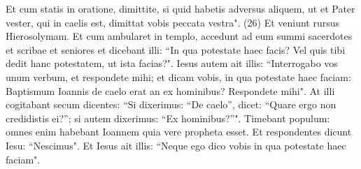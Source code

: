 \begin{biblechapter}
\verse Et cum statis in oratione, dimittite, si quid habetis adversus aliquem, ut et Pater vester, qui in caelis est, dimittat vobis peccata vestra". (26) 
\verse Et veniunt rursus Hierosolymam. Et cum ambularet in templo, accedunt ad eum summi sacerdotes et scribae et seniores 
\verse et dicebant illi: “In qua potestate haec facis? Vel quis tibi dedit hanc potestatem, ut ista facias?". 
\verse Iesus autem ait illis: “Interrogabo vos unum verbum, et respondete mihi; et dicam vobis, in qua potestate haec faciam: 
\verse Baptismum Ioannis de caelo erat an ex hominibus? Respondete mihi". 
\verse At illi cogitabant secum dicentes: “Si dixerimus: “De caelo”, dicet: “Quare ergo non credidistis ei?”; 
\verse si autem dixerimus: “Ex hominibus?”". Timebant populum: omnes enim habebant Ioannem quia vere propheta esset. 
\verse Et respondentes dicunt Iesu: “Nescimus". Et Iesus ait illis: “Neque ego dico vobis in qua potestate haec faciam". 
\end{biblechapter}

